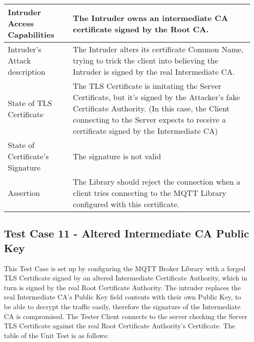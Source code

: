 \documentclass[binding=0.6cm,noexaminfo]{sapthesis}
\begin{document}
\begin{center}
\begin{tabular}{| p{6cm} | p{6cm} |}
\hline
Intruder Access Capabilities & The Intruder owns an intermediate CA certificate signed by the Root CA. \\
\hline
Intruder’s Attack description & The Intruder alters its certificate Common Name, trying to trick the client into believing the Intruder is signed by the real Intermediate CA. \\
\hline
State of TLS Certificate & The TLS Certificate is imitating the Server Certificate, but it’s signed by the Attacker’s fake Certificate Authority. (In this case, the Client connecting to the Server expects to receive a certificate signed by the Intermediate CA) \\
\hline
State of Certificate’s Signature & The signature is not valid \\
\hline
Assertion & The Library should reject the connection when a client tries connecting to the MQTT Library configured with this certificate. \\
\hline
\end{tabular}
\end{center}

\subsection{Test Case 11 - Altered Intermediate CA Public Key}
This Test Case is set up by configuring the MQTT Broker Library with a forged TLS Certificate signed by an altered Intermediate Certificate Authority, which in turn is signed by the real Root Certificate Authority. The intruder replaces the real Intermediate CA’s Public Key field contents with their own Public Key, to be able to decrypt the traffic easily, therefore the signature of the Intermediate CA is compromised. The Tester Client connects to the server checking the Server TLS Certificate against the real Root Certificate Authority’s Certificate. The table of the Unit Test is as follows:
\end{document}
